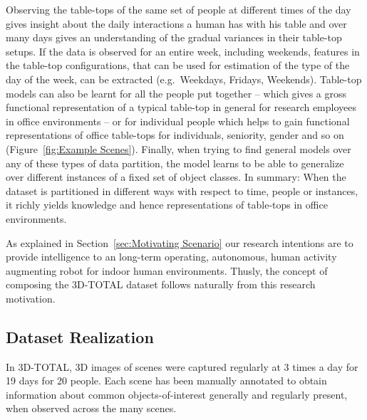 \documentclass[letterpaper, 10 pt, conference]{ieeeconf}  %
\begin{document}
Observing the table-tops of the same set of people at different times of the day gives insight about the daily interactions a human has with his table and over many days gives an understanding of the gradual variances in their table-top setups. If the data is observed for an entire week, including weekends, features in the table-top configurations, that can be used for estimation of the type of the day of the week, can be extracted (e.g.\ Weekdays, Fridays, Weekends). Table-top models can also be learnt for all the people put together -- which gives a gross functional representation of a typical table-top in general for research employees in office environments -- or for individual people which helps to gain functional representations of office table-tops for individuals, seniority, gender and so on (Figure~\ref{fig:Example Scenes}). Finally, when trying to find general models over any of these types of data partition, the model learns to be able to generalize over different instances of a fixed set of object classes. In summary: When the dataset is partitioned in different ways with respect to time, people or instances, it richly yields knowledge and hence representations of table-tops in office environments.

As explained in Section~\ref{sec:Motivating Scenario} our research intentions are to provide intelligence to an long-term operating, autonomous, human activity augmenting robot for indoor human environments. Thusly, the concept of composing the 3D-TOTAL dataset follows naturally from this research motivation.

\subsection{Dataset Realization}
\label{ssec:Dataset Realization}
In 3D-TOTAL, 3D images of scenes were captured regularly at 3 times a day for 19 days for 20 people. Each scene has been manually annotated to obtain information about common objects-of-interest generally and regularly present, when observed across the many scenes.
\end{document}
